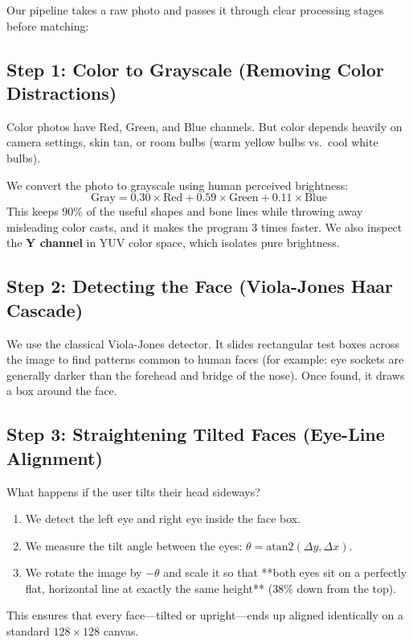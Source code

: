 \documentclass[11pt,a4paper]{article}
\begin{document}
Our pipeline takes a raw photo and passes it through clear processing stages before matching:

\subsection{Step 1: Color to Grayscale (Removing Color Distractions)}
Color photos have Red, Green, and Blue channels. But color depends heavily on camera settings, skin tan, or room bulbs (warm yellow bulbs vs.\ cool white bulbs). 

We convert the photo to grayscale using human perceived brightness:
\begin{equation}
    \text{Gray} = 0.30 \times \text{Red} + 0.59 \times \text{Green} + 0.11 \times \text{Blue}
\end{equation}
This keeps $90\%$ of the useful shapes and bone lines while throwing away misleading color casts, and it makes the program 3 times faster. We also inspect the \textbf{Y channel} in YUV color space, which isolates pure brightness.

\subsection{Step 2: Detecting the Face (Viola-Jones Haar Cascade)}
We use the classical Viola-Jones detector. It slides rectangular test boxes across the image to find patterns common to human faces (for example: eye sockets are generally darker than the forehead and bridge of the nose). Once found, it draws a box around the face.

\subsection{Step 3: Straightening Tilted Faces (Eye-Line Alignment)}
What happens if the user tilts their head sideways?
\begin{enumerate}[leftmargin=1.5em]
    \item We detect the left eye and right eye inside the face box.
    \item We measure the tilt angle between the eyes: $\theta = \text{atan2}(\Delta y, \Delta x)$.
    \item We rotate the image by $-\theta$ and scale it so that **both eyes sit on a perfectly flat, horizontal line at exactly the same height** ($38\%$ down from the top).
\end{enumerate}
This ensures that every face—tilted or upright—ends up aligned identically on a standard $128 \times 128$ canvas.
\end{document}
